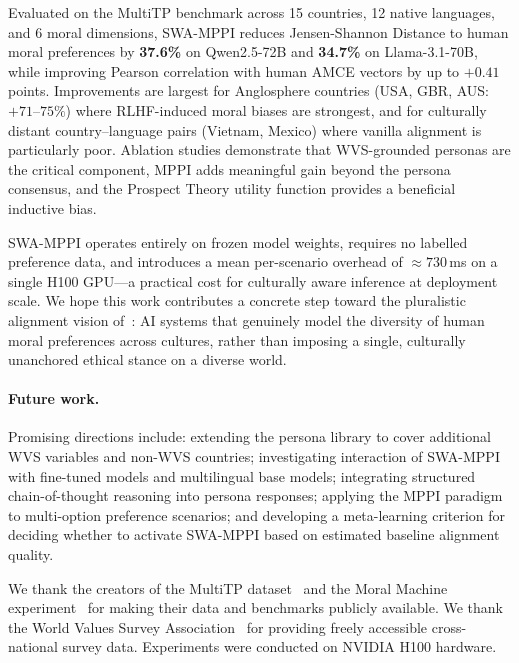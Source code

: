 \documentclass{article}
\begin{document}
Evaluated on the MultiTP benchmark across 15 countries, 12 native languages, and 6 moral
dimensions, SWA-MPPI reduces Jensen-Shannon Distance to human moral preferences by
\textbf{37.6\%} on Qwen2.5-72B and \textbf{34.7\%} on Llama-3.1-70B, while improving
Pearson correlation with human AMCE vectors by up to $+0.41$ points. Improvements are
largest for Anglosphere countries (USA, GBR, AUS: $+71$--$75\%$) where RLHF-induced
moral biases are strongest, and for culturally distant country--language pairs
(Vietnam, Mexico) where vanilla alignment is particularly poor. Ablation studies
demonstrate that WVS-grounded personas are the critical component, MPPI adds
meaningful gain beyond the persona consensus, and the Prospect Theory utility function
provides a beneficial inductive bias.

SWA-MPPI operates entirely on frozen model weights, requires no labelled preference data,
and introduces a mean per-scenario overhead of $\approx 730$\,ms on a single H100
GPU---a practical cost for culturally aware inference at deployment scale. We hope this
work contributes a concrete step toward the pluralistic alignment vision
of~\citet{sorensen2024roadmap}: AI systems that genuinely model the diversity of human
moral preferences across cultures, rather than imposing a single, culturally unanchored
ethical stance on a diverse world.

\paragraph{Future work.}
Promising directions include: extending the persona library to cover additional WVS
variables and non-WVS countries; investigating interaction of SWA-MPPI with fine-tuned
models and multilingual base models; integrating structured chain-of-thought reasoning
into persona responses; applying the MPPI paradigm to multi-option preference scenarios;
and developing a meta-learning criterion for deciding whether to activate SWA-MPPI based
on estimated baseline alignment quality.

\begin{ack}
We thank the creators of the MultiTP dataset~\citep{jin2025multitp} and the Moral Machine
experiment~\citep{awad2018moral} for making their data and benchmarks publicly available.
We thank the World Values Survey Association~\citep{haerpfer2022wvs} for providing freely
accessible cross-national survey data. Experiments were conducted on NVIDIA H100 hardware.
\end{ack}



\end{document}
